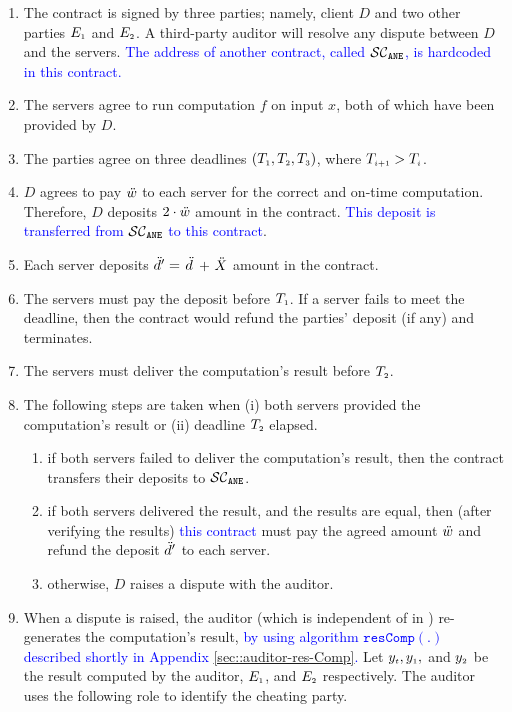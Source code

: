 \begin{enumerate}
%
\item The contract is signed by three parties; namely, client $ {D}$ and two other parties $E_{\scriptscriptstyle 1}$ and $E_{\scriptscriptstyle 2}$. A third-party auditor will resolve any dispute between $ { D}$ and the servers.  \textcolor{blue}{The address of another contract, called $\mathcal{SC}_{\mathtt{ANE}}$, is hardcoded in this contract.} 
%
\item The servers agree to run computation $f$ on input $x$, both of which have been provided by $ { D}$. 
%
\item The parties agree on three deadlines $(T_{\scriptscriptstyle 1}, T_{\scriptscriptstyle 2}, T_{\scriptscriptstyle 3})$, where $T_{\scriptscriptstyle i+1} > T_{\scriptscriptstyle i}$.
%
\item $ { D}$ agrees to pay $\ddot{w}$ to each server for the correct and on-time computation. Therefore, $ { D}$ deposits $2\cdot \ddot{w}$ amount in the contract. \textcolor{blue}{This deposit is transferred from $\mathcal{SC}_{\mathtt{ANE}}$ to this contract}.
%
\item Each server deposits \textcolor{blue}{$\ddot{d}'=$ }$\ddot{d}$\textcolor{blue}{$\ +\ \ddot{X}$} amount in the contract. 
%
\item The servers must pay the deposit before $T_{\scriptscriptstyle 1}$. If a server fails to meet the deadline, then the contract would refund the parties' deposit (if any) and terminates.  
%
\item The servers must deliver the computation's result before $T_{\scriptscriptstyle 2}$. 
%
\item  The following steps are taken when (i) both servers provided the computation's result or (ii) deadline $T_{\scriptscriptstyle 2}$ elapsed. 
%
\begin{enumerate}
%
\item if both servers failed to deliver the computation's result, then the contract transfers their deposits to \textcolor{blue}{$\mathcal{SC}_{\mathtt{ANE}}$}.
%
\item if both servers delivered the result, and the results are equal, then (after verifying the results) \textcolor{blue}{this contract} must pay the agreed
amount $\ddot{w}$ and refund the deposit $\ddot{d}'$ to each server. 
%
\item\label{prisoner-cont-raise-disp} otherwise, $ { D}$ raises a dispute with the auditor.  
%
\end{enumerate}
%
\item When a dispute is raised, the auditor (which is independent of \aud in \fpsi) re-generates the computation's result, \textcolor{blue}{by using algorithm $\mathtt{resComp}(.)$ described shortly in Appendix \ref{sec::auditor-res-Comp}.} Let $y_{\scriptscriptstyle t}, y_{\scriptscriptstyle 1},$ and $y_{\scriptscriptstyle 2}$ be the result computed by the auditor, $E_{\scriptscriptstyle 1}$, and $E_{\scriptscriptstyle 2}$ respectively. The auditor uses the following role to identify the cheating party.  

\end{enumerate}
